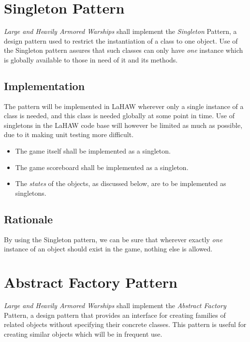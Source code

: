 
    \section{Singleton Pattern}
    \emph{Large and Heavily Armored Warships} shall implement the \emph{Singleton} Pattern, a design pattern used to restrict the instantiation of a class to one object\cite{singleton}.
    Use of the Singleton pattern assures that such classes can only have \emph{one} instance which is globally available to those in need of it and its methods.
    
        \subsection{Implementation}
        The pattern will be implemented in LaHAW wherever only a single instance of a class is needed, and this class is needed globally at some point in time. Use of singletons in the LaHAW code base will however be limited as much as possible, due to it making unit testing more difficult\cite{singleton_unit_testing}.
    
        \begin{itemize}
            \item The game itself shall be implemented as a singleton.
            \item The game scoreboard shall be implemented as a singleton.
            \item The \emph{states} of the objects, as discussed below, are to be implemented as singletons.
        \end{itemize}
    
        \subsection{Rationale}
        By using the Singleton pattern, we can be sure that wherever exactly \emph{one} instance of an object should exist in the game, nothing else is allowed.
    

\section{Abstract Factory Pattern}
\emph{Large and Heavily Armored Warships} shall implement the \emph{Abstract Factory} Pattern, a design pattern that provides an interface for creating families of related objects without specifying their concrete classes\cite{abstractfactory}. This pattern is useful for creating similar objects which will be in frequent use.


